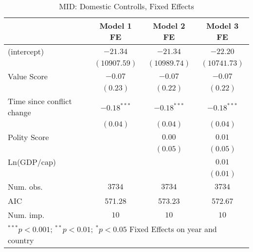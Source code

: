 
\begin{table}
\begin{center}
\begin{tabular}{l c c c}
\toprule
 & Model 1 FE & Model 2 FE & Model 3 FE \\
\midrule
(intercept)                & $-21.34$      & $-21.34$      & $-22.20$      \\
                           & $(10907.59)$  & $(10989.74)$  & $(10741.73)$  \\
Value Score                & $-0.07$       & $-0.07$       & $-0.07$       \\
                           & $(0.23)$      & $(0.22)$      & $(0.22)$      \\
Time since conflict change & $-0.18^{***}$ & $-0.18^{***}$ & $-0.18^{***}$ \\
                           & $(0.04)$      & $(0.04)$      & $(0.04)$      \\
Polity Score               &               & $0.00$        & $0.01$        \\
                           &               & $(0.05)$      & $(0.05)$      \\
Ln(GDP/cap)                &               &               & $0.01$        \\
                           &               &               & $(0.01)$      \\
\midrule
Num. obs.                  & $3734$        & $3734$        & $3734$        \\
AIC                        & 571.28        & 573.23        & 572.67        \\
Num. imp.                  & $10$          & $10$          & $10$          \\
\bottomrule
\multicolumn{4}{l}{\scriptsize{ $^{***}p<0.001$; $^{**}p<0.01$; $^{*}p<0.05$ 
 Fixed Effects on year and country}}
\end{tabular}
\caption{MID: Domestic Controlls, Fixed Effects}
\label{MID_1_FE}
\end{center}
\end{table}
